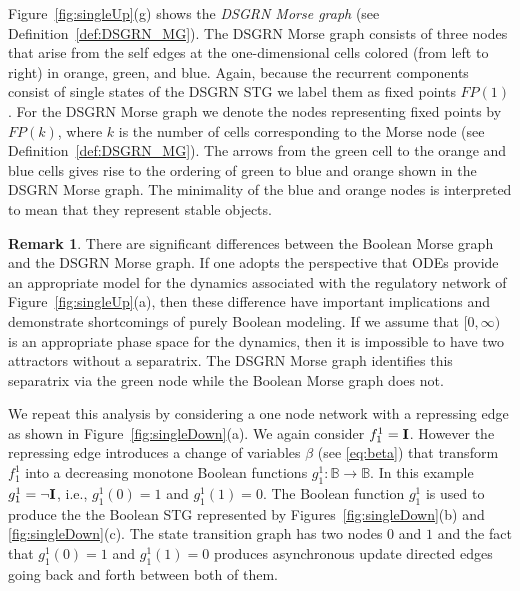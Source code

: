 \documentclass[12pt, notitlepage]{amsart}
\newcommand{\B}{{\mathbb{B}}}
\theoremstyle{definition}
\newtheorem{rem}[thm]{Remark}
\begin{document}
Figure~\ref{fig:singleUp}(g) shows the \textit{DSGRN Morse graph} (see Definition~\ref{def:DSGRN_MG}). The DSGRN Morse graph consists of three nodes that arise from the self edges at the one-dimensional cells colored (from left to right) in orange, green, and blue. Again, because the recurrent components consist of single states of the DSGRN STG we label them as fixed points $FP(1)$. For the DSGRN Morse graph we denote the nodes representing fixed points by $FP(k)$, where $k$ is the number of cells corresponding to the Morse node (see Definition~\ref{def:DSGRN_MG}).  The arrows from the green cell to the orange and blue cells gives rise to the ordering of green to blue and orange shown in the DSGRN Morse graph. The minimality of the blue and orange nodes is interpreted to mean that they represent stable objects.

\begin{rem}
  There are significant differences between the Boolean Morse graph and the DSGRN Morse graph. If one adopts the perspective that ODEs provide an appropriate model for the dynamics associated with the regulatory network  of Figure~\ref{fig:singleUp}(a), then these difference have important implications and demonstrate shortcomings of purely Boolean modeling. If we assume that $[0,\infty)$ is an appropriate phase space for the dynamics, then it is impossible to have two attractors without a separatrix. The DSGRN Morse graph identifies this separatrix via the green node while the Boolean Morse graph does not.
\end{rem}

We repeat this analysis by considering a one node network with a repressing edge as shown in Figure~\ref{fig:singleDown}(a). We again consider $f_1^1 = {\bf I}$. However the repressing edge introduces a change of variables $\beta$ (see \eqref{eq:beta}) that transform $f_1^1$ into a decreasing monotone Boolean functions $g_1^1 \colon \B\to \B$. In this example $g_1^1 = \neg {\bf I}$, i.e., $g_1^1(0) = 1$ and $g_1^1(1) = 0$. The Boolean function $g_1^1$ is used to produce the the Boolean STG represented by Figures~\ref{fig:singleDown}(b) and \ref{fig:singleDown}(c). The state transition graph has two nodes $0$ and $1$ and the fact that $g_1^1(0) = 1$ and $g_1^1(1) = 0$ produces asynchronous update directed edges going back and forth between both of them.
\end{document}
